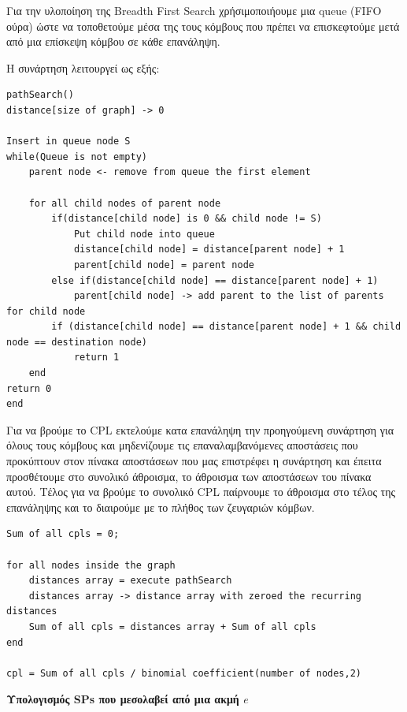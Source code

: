 \documentclass{article}
\begin{document}
Για την υλοποίηση της  Breadth First Search χρήσιμοποιήουμε μια queue (FIFO ούρα) ώστε να τοποθετούμε μέσα της τους κόμβους που πρέπει να επισκεφτούμε μετά από μια επίσκεψη κόμβου σε κάθε επανάληψη.\pagebreak

Η συνάρτηση λειτουργεί ως εξής:

\begin{lstlisting}
pathSearch()
distance[size of graph] -> 0

Insert in queue node S
while(Queue is not empty)
	parent node <- remove from queue the first element
	
	for all child nodes of parent node
		if(distance[child node] is 0 && child node != S)
			Put child node into queue
			distance[child node] = distance[parent node] + 1
			parent[child node] = parent node
		else if(distance[child node] == distance[parent node] + 1)
			parent[child node] -> add parent to the list of parents for child node
		if (distance[child node] == distance[parent node] + 1 && child node == destination node)
			return 1
	end	
return 0
end
\end{lstlisting}\bigbreak
{}

Για να βρούμε το CPL εκτελούμε κατα επανάληψη την προηγούμενη συνάρτηση για όλους τους κόμβους και μηδενίζουμε τις επαναλαμβανόμενες αποστάσεις που προκύπτουν στον πίνακα αποστάσεων που μας επιστρέφει η συνάρτηση και έπειτα προσθέτουμε στο συνολικό άθροισμα, το άθροισμα των αποστάσεων του πίνακα αυτού.\bigbreak
Τέλος για να βρούμε το συνολικό CPL παίρνουμε το άθροισμα στο τέλος της επανάληψης και το διαιρούμε με το πλήθος των ζευγαριών κόμβων.

\begin{lstlisting}
Sum of all cpls = 0;

for all nodes inside the graph
	distances array = execute pathSearch
	distances array -> distance array with zeroed the recurring distances
	Sum of all cpls = distances array + Sum of all cpls
end

cpl = Sum of all cpls / binomial coefficient(number of nodes,2)
\end{lstlisting}\pagebreak
{}

\textbf{Υπολογισμός SPs που μεσολαβεί από μια ακμή $e$}\bigbreak
\end{document}
